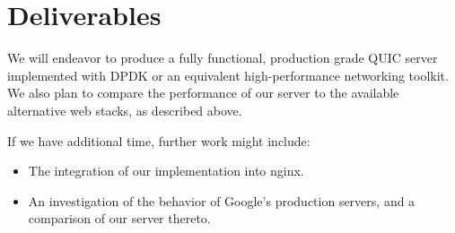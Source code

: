 \documentclass{article}
\begin{document}
\section{Deliverables}

We will endeavor to produce a fully functional, production grade QUIC server implemented with DPDK or an equivalent high-performance networking toolkit.
We also plan to compare the performance of our server to the available alternative web stacks, as described above.

If we have additional time,
further work might include:
\begin{itemize}
\item The integration of our implementation into nginx.
\item An investigation of the behavior of Google's production servers, and a comparison of our server thereto.
\end{itemize}
\end{document}
